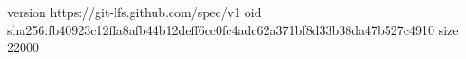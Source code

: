 version https://git-lfs.github.com/spec/v1
oid sha256:fb40923c12ffa8afb44b12deff6cc0fc4adc62a371bf8d33b38da47b527c4910
size 22000
